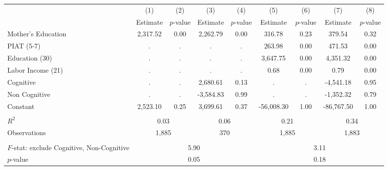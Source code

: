 \begin{tabular}{lcccccccc} \toprule
 & (1) & (2) & (3) & (4) & (5) & (6) & (7) & (8) \\
 & Estimate & $p$-value & Estimate & $p$-value  & Estimate & $p$-value  & Estimate & $p$-value  \\ \midrule 
Mother's Education &     2,317.52 &         0.00 &     2,262.79 &         0.00 &       316.78 &         0.23 &       379.54 &         0.32 \\  
PIAT (5-7) &            . &            . &            . &            . &       263.98 &         0.00 &       471.53 &         0.00 \\  
Education (30) &            . &            . &            . &            . &     3,647.75 &         0.00 &     4,351.32 &         0.00 \\  
Labor Income (21) &            . &            . &            . &            . &         0.68 &         0.00 &         0.79 &         0.00 \\  
Cognitive &            . &            . &     2,680.61 &         0.13 &            . &            . &    -4,541.18 &         0.95 \\  
Non Cognitive &            . &            . &    -3,584.83 &         0.99 &            . &            . &    -1,352.32 &         0.79 \\  
Constant &     2,523.10 &         0.25 &     3,699.61 &         0.37 &   -56,008.30 &         1.00 &   -86,767.50 &         1.00 \\ \\ \midrule
$R^2$ &         \multicolumn{2}{c}{0.03} &              \multicolumn{2}{c}{0.06} &               \multicolumn{2}{c}{0.21} &                \multicolumn{2}{c}{0.34}  \\  
Observations &       \multicolumn{2}{c}{1,885} &            \multicolumn{2}{c}{370} &           \multicolumn{2}{c}{1,885} &          \multicolumn{2}{c}{1,883}   \\  \\ \midrule
$F$-stat: exclude Cognitive, Non-Cognitive &                      \multicolumn{4}{c}{5.90} &                      \multicolumn{4}{c}{3.11}   \\  
$p$-value &             \multicolumn{4}{c}{0.05} &                  \multicolumn{4}{c}{0.18}  \\    \bottomrule \end{tabular}

